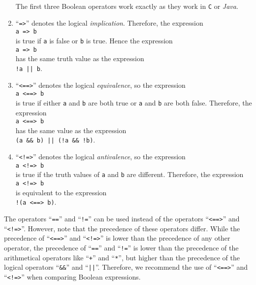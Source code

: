 \begin{enumerate}
      The first three Boolean operators work exactly as they work in \texttt{C} or \textsl{Java}.
\item ``\texttt{=>}'' denotes the logical \emph{implication}.
      Therefore, the expression
      \\[0.2cm]
      \hspace*{1.3cm}
      \texttt{a => b}
      \\[0.2cm]
      is true if \texttt{a} is false or \texttt{b} is true. Hence the expression 
      \\[0.2cm]
      \hspace*{1.3cm}
      \texttt{a => b}
      \\[0.2cm]
      has the same truth value as the expression
      \\[0.2cm]
      \hspace*{1.3cm}
      \texttt{!a || b}.
\item ``\texttt{<==>}'' denotes the logical \emph{equivalence},
      so the expression
      \\[0.2cm]
      \hspace*{1.3cm}
      \texttt{a <==> b}
      \\[0.2cm]
      is true if either  \texttt{a} and \texttt{b} are both true or \texttt{a} and
      \texttt{b} are both false. Therefore,  the expression 
      \\[0.2cm]
      \hspace*{1.3cm}
      \texttt{a <==> b}
      \\[0.2cm]
      has the same value as the expression
      \\[0.2cm]
      \hspace*{1.3cm}
      \texttt{(a \&\& b) || (!a \&\& !b)}.
\item ``\texttt{<!=>}'' denotes the logical \emph{antivalence},
      so the expression
      \\[0.2cm]
      \hspace*{1.3cm}
      \texttt{a <!=> b}
      \\[0.2cm]
      is true if the truth values of \texttt{a} and \texttt{b} are different.
      Therefore,  the expression 
      \\[0.2cm]
      \hspace*{1.3cm}
      \texttt{a <!=> b}
      \\[0.2cm]
      is equivalent to the expression
      \\[0.2cm]
      \hspace*{1.3cm}
      \texttt{!(a <==> b)}.
\end{enumerate}
The operators ``\texttt{==}'' and ``\texttt{!=}'' can be used instead of the operators
``\texttt{<==>}'' and ``\texttt{<!=>}''.   However, note that the precedence of these operators 
differ.  While the precedence of ``\texttt{<==>}'' and ``\texttt{<!=>}'' is lower than the
precedence of any other operator,  the precedence of ``\texttt{==}'' and ``\texttt{!=}'' is lower
than the precedence of the arithmetical operators like ``\texttt{+}'' and ``\texttt{*}'', but higher
than the precedence of the logical operators ``\texttt{\&\&}'' and ``\texttt{||}''.  Therefore, we
recommend the use of ``\texttt{<==>}'' and ``\texttt{<!=>}'' when comparing Boolean expressions.

